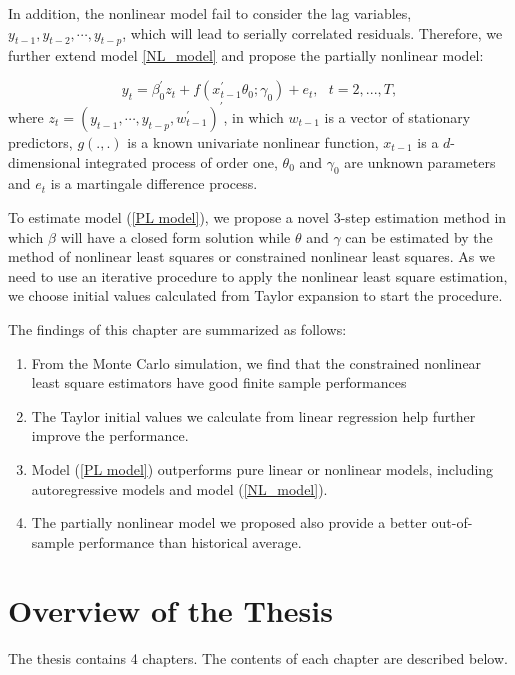 \documentclass[a4paper,12pt,times,numbered,print,index]{report}
\numberwithin{equation}{section}
\begin{document}
In addition, the nonlinear model fail to consider the lag variables, $y_{t-1}, y_{t-2}, \cdots, y_{t-p}$, which will lead to serially correlated residuals. Therefore, we further extend model \ref{NL_model} and propose the partially nonlinear model:

\begin{equation}
	y_{t} = \beta_0^{\prime} z_t + f\left( x_{t-1}^{\prime }\theta_0; \gamma_0\right) +e_{t},\ \ \
	t=2,...,T,  
	\label{PL model}
\end{equation}%
where $z_t = (y_{t-1}, \cdots, y_{t-p}, w_{t-1}^{\prime})^{\prime}$, in which $w_{t-1}$ is a vector of stationary predictors, $g\left( .,.\right) $ is a known univariate nonlinear function, $x_{t-1}$ is a $d$-dimensional integrated process of order one, $\theta _{0}$ and $\gamma _{0}$ are unknown parameters and $e_{t}$ is a martingale
difference process.

To estimate model (\ref{PL model}), we propose a novel 3-step estimation method in which $\beta$ will have a closed form solution while $\theta$ and $\gamma$ can be estimated by the method of nonlinear least squares or constrained nonlinear least squares. As we need to use an iterative procedure to apply the nonlinear least square estimation, we choose initial values calculated from Taylor expansion to start the procedure.

The findings of this chapter are summarized as follows:

\begin{enumerate}
    \item From the Monte Carlo simulation, we find that the constrained nonlinear least square estimators have good finite sample performances
    
    \item The Taylor initial values we calculate from linear regression help further improve the performance. 
    
    \item Model (\ref{PL model}) outperforms pure linear or nonlinear models, including autoregressive models and model (\ref{NL_model}).
    
    \item The partially nonlinear model we proposed also provide a better out-of-sample performance than historical average.
\end{enumerate}

\section{Overview of the Thesis}
The thesis contains 4 chapters. The contents of each chapter are described below.
\end{document}
